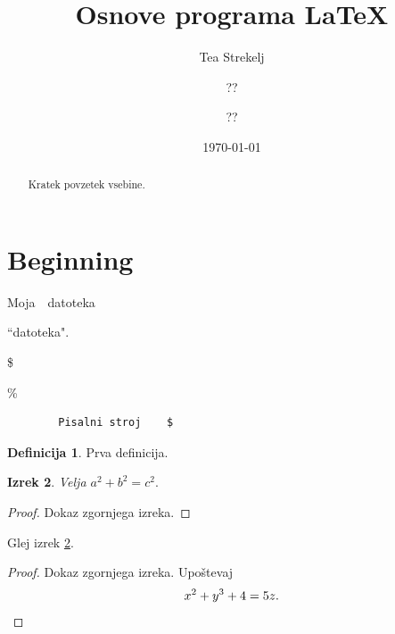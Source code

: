 \documentclass[11pt,a4paper]{article}
\title{Osnove programa \LaTeX}
\author{Tea Strekelj \and ?? \and ??}
\date{\today}
\theoremstyle{plain}
\theoremstyle{definition}
\theoremstyle{plain}
\newtheorem{izrek}{Izrek}[section]
\theoremstyle{definition}
\newtheorem{definicija}[izrek]{Definicija}
\begin{document}
\maketitle
\thispagestyle{empty}
\newpage

\begin{abstract}
	Kratek povzetek vsebine.
\end{abstract}

\newpage
	
	\section{Beginning}\label{sec:beg}

	Moja\ \  datoteka   
	
	``datoteka".
	
	\$
	
	\%
	
	

	
	\begin{verbatim}
		Pisalni stroj    $
	\end{verbatim}
	
	
	\begin{definicija}
		Prva definicija.
	\end{definicija}
	
	\begin{izrek}\label{izr:pitagora}
		Velja $a^2+b^2=c^2.$
	\end{izrek}
	
	\begin{proof}
		Dokaz zgornjega izreka. 
	\end{proof}
	
	Glej izrek \ref{izr:pitagora}.
	
	\begin{proof}
		Dokaz zgornjega izreka. Upoštevaj
			\begin{equation*}
			x^2+y^3+4 = 5z.\qedhere
			\end{equation*}
	\end{proof}
	
	
	
	
	
\end{document}
